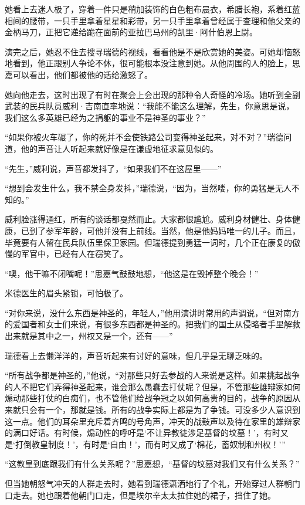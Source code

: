\par 她看上去迷人极了，穿着一件只是稍加装饰的白色粗布晨衣，希腊长袍，系着红蓝相间的腰带，一只手里拿着星星和彩带，另一只手里拿着曾经属于查理和他父亲的金柄马刀，正把它递给跪在面前的亚拉巴马州的凯里·阿什伯恩上尉。
\par 演完之后，她忍不住去搜寻瑞德的视线，看看他是不是欣赏她的美姿。可她却恼怒地看到，他正跟别人争论不休，很可能根本没注意到她。从他周围的人的脸上，思嘉可以看出，他们都被他的话给激怒了。
\par 她向他走去，这时出现了有时在聚会上会出现的那种令人奇怪的冷场。她听到全副武装的民兵队员威利·吉南直率地说：“我能不能这么理解，先生，你意思是说，我们这么多英雄已经为之捐躯的事业不是神圣的事业？”
\par “如果你被火车碾了，你的死并不会使铁路公司变得神圣起来，对不对？”瑞德问道，他的声音让人听起来就好像是在谦虚地征求意见似的。
\par “先生，”威利说，声音都发抖了，“如果我们不在这屋里——”
\par “想到会发生什么，我不禁全身发抖，”瑞德说，“因为，当然喽，你的勇猛是无人不知的。”
\par 威利脸涨得通红，所有的谈话都戛然而止。大家都很尴尬。威利身材健壮、身体健康，已到了参军年龄，可他并没有上前线。当然，他是他妈妈唯一的儿子。而且，毕竟要有人留在民兵队伍里保卫家园。但瑞德提到勇猛一词时，几个正在康复的傲慢的军官中，已经有人在窃笑了。
\par “噢，他干嘛不闭嘴呢！”思嘉气鼓鼓地想，“他这是在毁掉整个晚会！”
\par 米德医生的眉头紧锁，可怕极了。
\par “对你来说，没什么东西是神圣的，年轻人，”他用演讲时常用的声调说，“但对南方的爱国者和女士们来说，有很多东西都是神圣的。把我们的国土从侵略者手里解救出来就是其中之一，州权又是一个，还有——”
\par 瑞德看上去懒洋洋的，声音听起来有讨好的意味，但几乎是无聊乏味的。
\par “所有战争都是神圣的，”他说，“对那些只好去参战的人来说是这样。如果挑起战争的人不把它们弄得神圣起来，谁会那么愚蠢去打仗呢？但是，不管那些雄辩家如何煽动那些打仗的白痴们，也不管他们给战争冠之以如何高贵的目的，战争的原因从来就只会有一个，那就是钱。所有的战争实际上都是为了争钱。可没多少人意识到这一点。他们的耳朵里充斥着齐鸣的号角声，冲天的战鼓声以及待在家里的雄辩家的满口好话。有时候，煽动性的呼吁是‘不让异教徒涉足基督的坟墓！'，有时又是‘打倒教皇制度！'，有时是‘自由！'，而有时又成了‘棉花，蓄奴制和州权！'”
\par “这教皇到底跟我们有什么关系呢？”思嘉想，“基督的坟墓对我们又有什么关系？”
\par 但当她朝怒气冲天的人群走去时，她看到瑞德潇洒地行了个礼，开始穿过人群朝门口走去。她也跟着他朝门口走，但是埃尔辛太太拉住她的裙子，挡住了她。
